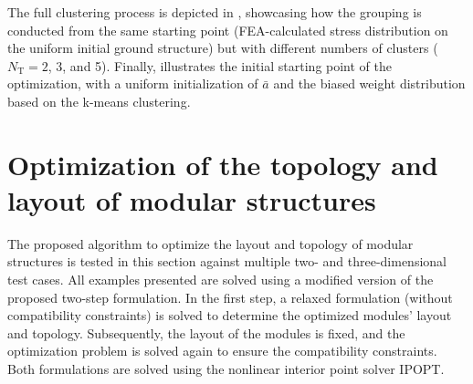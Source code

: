The full clustering process is depicted in , showcasing how the grouping is conducted from the same starting point (FEA-calculated stress distribution on the uniform initial ground structure) but with different numbers of clusters ($N_\text{T}=2$, 3, and 5). Finally,  illustrates the initial starting point of the optimization, with a uniform initialization of $\bar{a}$ and the biased weight distribution based on the k-means clustering.

\section{Optimization of the topology and layout of modular structures}\label{sec:06_num_app}
The proposed algorithm to optimize the layout and topology of modular structures is tested in this section against multiple two- and three-dimensional test cases. All examples presented are solved using a modified version of the proposed two-step formulation. In the first step, a relaxed formulation (without compatibility constraints) is solved to determine the optimized modules' layout and topology. Subsequently, the layout of the modules is fixed, and the optimization problem is solved again to ensure the compatibility constraints. Both formulations are solved using the nonlinear interior point solver IPOPT.


